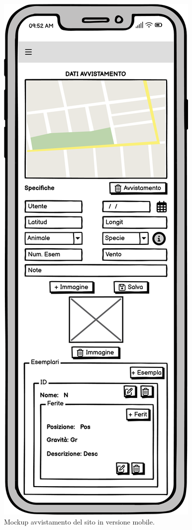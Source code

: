 \documentclass[a4paper,final,12pt]{report}
\begin{document}
\begin{figure}[hbtp]
\centering
\includegraphics[scale=0.50]{img_concettuale/avvistamentoMok.png}
\caption{Mockup avvistamento del sito in versione mobile.}
\end{figure}
\end{document}
